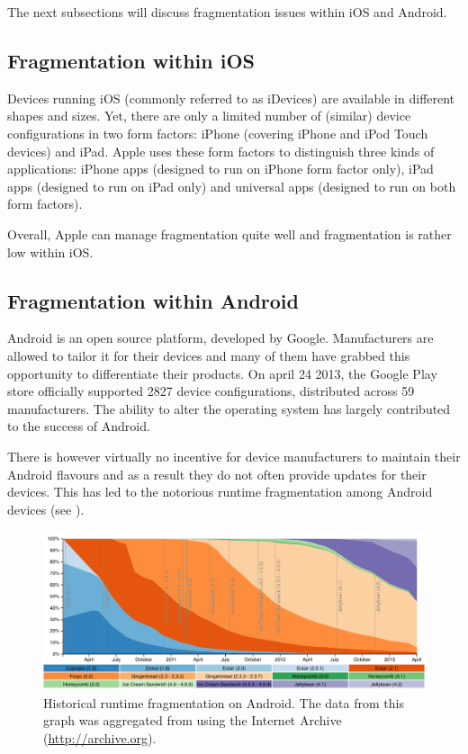 The next subsections will discuss fragmentation issues within iOS and Android.

\subsection{Fragmentation within iOS}

Devices running iOS (commonly referred to as iDevices) are available in different shapes and sizes. Yet, there are only a limited number of (similar) device configurations in two form factors: iPhone (covering iPhone and iPod Touch devices) and iPad. Apple uses these form factors to distinguish three kinds of applications: iPhone apps (designed to run on iPhone form factor only), iPad apps (designed to run on iPad only) and universal apps (designed to run on both form factors). 


Overall, Apple can manage fragmentation quite well and fragmentation is rather low within iOS.

\subsection{Fragmentation within Android}

Android is an open source platform, developed by Google. Manufacturers are allowed to tailor it for their devices and many of them have grabbed this opportunity to differentiate their products. On april 24 2013, the Google Play store officially supported 2827 device configurations, distributed across 59 manufacturers. The ability to alter the operating system has largely contributed to the success of Android.

There is however virtually no incentive for device manufacturers to maintain their Android flavours and as a result they do not often provide updates for their devices. This has led to the notorious runtime fragmentation among Android devices (see ).

\begin{figure}[h!]
    \begin{center}
        \includegraphics[width=\textwidth]{figs/android_runtimes.pdf}
        \caption{Historical runtime fragmentation on Android. The data from this graph was aggregated from \cite{Android:Versions} using the Internet Archive (\url{http://archive.org}).}
        \label{fig:android_runtimes}
    \end{center}
\end{figure}

